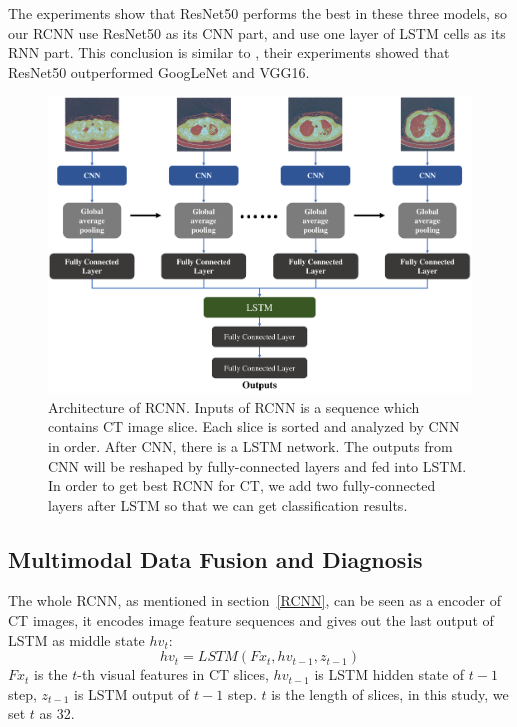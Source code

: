 \documentclass[journal]{IEEEtran}
\begin{document}
The experiments show that ResNet50 performs the best in these three models, so our RCNN use ResNet50 as its CNN part, and use one layer of LSTM cells as its RNN part. This conclusion is similar to \cite{Wang2017ChestX}, their experiments showed that ResNet50 outperformed GoogLeNet and VGG16.

\begin{figure}[t]
    \centerline{\includegraphics[width=150mm]{onestream.pdf}}
    \vspace{-0cm}
    \caption{Architecture of RCNN. Inputs of RCNN is a sequence which contains CT image slice. Each slice is sorted and analyzed by CNN in order. After CNN, there is a LSTM network. The outputs from CNN will be reshaped by fully-connected layers and fed into LSTM. In order to get best RCNN for CT, we add two fully-connected layers after LSTM so that we can get classification results.}
    \vspace{-0cm}
    \label{onestream}
    \end{figure}

\subsection{Multimodal Data Fusion and Diagnosis}
\label{MMDDtxt}

The whole RCNN, as mentioned in section~\ref{RCNN}, can be seen as a encoder of CT images, it encodes image feature sequences and gives out the last output of LSTM as middle state $hv_t$:
\begin{equation}
hv_t = LSTM(Fx_t, hv_{t-1}, z_{t-1})
\label{hvt}
\end{equation}
$Fx_t$ is the $t$-th visual features in CT slices, $hv_{t-1}$ is LSTM hidden state of $t-1$ step, $z_{t-1}$ is LSTM output of $t-1$ step. $t$ is the length of slices, in this study, we set $t$ as 32.
\end{document}
